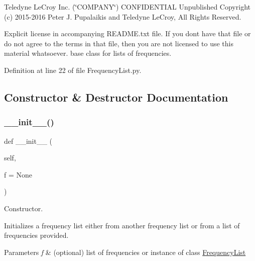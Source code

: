 Teledyne Le\+Croy Inc. (\char`\"{}\+C\+O\+M\+P\+A\+N\+Y\char`\"{}) C\+O\+N\+F\+I\+D\+E\+N\+T\+I\+AL Unpublished Copyright (c) 2015-\/2016 Peter J. Pupalaikis and Teledyne Le\+Croy, All Rights Reserved.

Explicit license in accompanying R\+E\+A\+D\+M\+E.\+txt file. If you don\textquotesingle{}t have that file or do not agree to the terms in that file, then you are not licensed to use this material whatsoever. base class for lists of frequencies. 

Definition at line 22 of file Frequency\+List.\+py.



\subsection{Constructor \& Destructor Documentation}
\mbox{\label{classSignalIntegrity_1_1FrequencyDomain_1_1FrequencyList_1_1FrequencyList_a8e9ec4f7f7796f2f07894cd60aeecdcd}} 
\subsubsection{\texorpdfstring{\+\_\+\+\_\+init\+\_\+\+\_\+()}{\_\_init\_\_()}}
{\footnotesize\ttfamily def \+\_\+\+\_\+init\+\_\+\+\_\+ (\begin{DoxyParamCaption}\item[{}]{self,  }\item[{}]{f = {\ttfamily None} }\end{DoxyParamCaption})}



Constructor. 

Initializes a frequency list either from another frequency list or from a list of frequencies provided. 
\begin{DoxyParams}{Parameters}
{\em f} & (optional) list of frequencies or instance of class \hyperlink{classSignalIntegrity_1_1FrequencyDomain_1_1FrequencyList_1_1FrequencyList}{Frequency\+List} \\
\hline
\end{DoxyParams}


